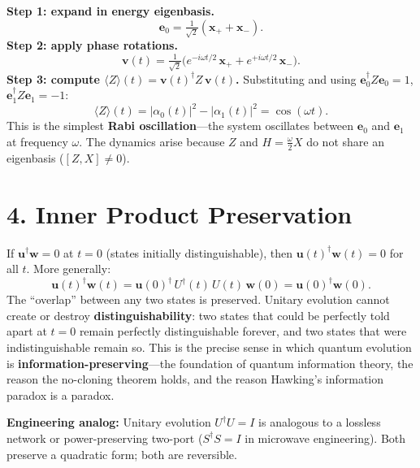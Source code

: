\documentclass[12pt,a4paper]{article}
\begin{document}
\noindent\textbf{Step 1: expand in energy eigenbasis.}
\[
    \mathbf{e}_0 = \tfrac{1}{\sqrt{2}}(\mathbf{x}_++\mathbf{x}_-).
\]
\textbf{Step 2: apply phase rotations.}
\[
    \mathbf{v}(t) = \tfrac{1}{\sqrt{2}}\bigl(e^{-i\omega t/2}\,\mathbf{x}_+ + e^{+i\omega t/2}\,\mathbf{x}_-\bigr).
\]
\textbf{Step 3: compute $\langle Z\rangle(t) = \mathbf{v}(t)^\dagger Z\,\mathbf{v}(t)$.}  Substituting and using $\mathbf{e}_0^\dagger Z\mathbf{e}_0=1$, $\mathbf{e}_1^\dagger Z\mathbf{e}_1=-1$:
\[
    \langle Z\rangle(t) = |\alpha_0(t)|^2 - |\alpha_1(t)|^2 = \cos(\omega t).
\]
This is the simplest \textbf{Rabi oscillation}---the system oscillates between $\mathbf{e}_0$ and $\mathbf{e}_1$ at frequency $\omega$.  The dynamics arise because $Z$ and $H=\frac{\omega}{2}X$ do not share an eigenbasis ($[Z,X]\neq 0$).

\medskip
\noindent{}

\section{4. Inner Product Preservation}

If $\mathbf{u}^\dagger\mathbf{w} = 0$ at $t=0$ (states initially distinguishable), then $\mathbf{u}(t)^\dagger\mathbf{w}(t) = 0$ for all $t$.  More generally:
\[
    \mathbf{u}(t)^\dagger\mathbf{w}(t) = \mathbf{u}(0)^\dagger\,U^\dagger(t)\,U(t)\,\mathbf{w}(0) = \mathbf{u}(0)^\dagger\mathbf{w}(0).
\]
The ``overlap'' between any two states is preserved.  Unitary evolution cannot create or destroy \textbf{distinguishability}: two states that could be perfectly told apart at $t=0$ remain perfectly distinguishable forever, and two states that were indistinguishable remain so.  This is the precise sense in which quantum evolution is \textbf{information-preserving}---the foundation of quantum information theory, the reason the no-cloning theorem holds, and the reason Hawking's information paradox is a paradox.

\medskip
\noindent\textbf{Engineering analog:} Unitary evolution $U^\dagger U = I$ is analogous to a lossless network or power-preserving two-port ($S^\dagger S = I$ in microwave engineering).  Both preserve a quadratic form; both are reversible.
\end{document}

